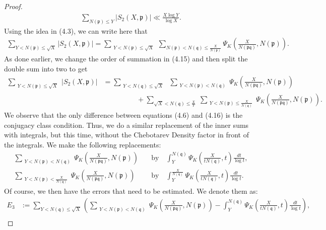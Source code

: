 \documentclass[12pt]{article}
\numberwithin{equation}{section}
\numberwithin{equation}{section}
\begin{document}
\begin{proof}
\begin{align}
    \sum_{N(\mathfrak{p})\leq Y} |S_2(X,\mathfrak{p})| \ll\frac{X\log Y}{\log X}.
\end{align}
Using the idea in (4.3), we can write here that
\begin{align}
    \sum_{Y<N(\mathfrak{p}) \leq \sqrt{X}} |S_2(X,\mathfrak{p})| = \sum_{\substack{Y<N(\mathfrak{p}) \leq \sqrt{X} }} \sum_{N(\mathfrak{p})<N(\mathfrak{q})\leq \frac{X}{N(\mathfrak{p})}} \Psi_K\left(\frac{X}{N(\mathfrak{p}\mathfrak{q})},N(\mathfrak{p})\right) .
\end{align}
As done earlier, we change the order of summation in (4.15) and then split the double sum into two to get
\begin{align}
    \sum_{\substack{Y<N(\mathfrak{p}) \leq \sqrt{X} }} |S_2(X,\mathfrak{p})| &= \sum_{\substack{Y <N(\mathfrak{q}) \leq \sqrt{X}}} \;  \sum_{\substack{Y<N(\mathfrak{p})<N(\mathfrak{q}) }} \Psi_K\left(\frac{X}{N(\mathfrak{p}\mathfrak{q})},N(\mathfrak{p})\right) \nonumber \\ &\hspace{2cm}+ \sum_{\sqrt{X} < N(\mathfrak{q}) \leq \frac{X}{Y}} \;\sum_{\substack{Y<N(\mathfrak{p})\leq \frac{X}{N(\mathfrak{q})}} } \Psi_K\left(\frac{X}{N(\mathfrak{p}\mathfrak{q})},N(\mathfrak{p})\right) .
\end{align}
We observe that the only difference between equations (4.6) and (4.16) is the conjugacy class condition. Thus, we do a similar replacement of the inner sums with integrals, but this time, without the Chebotarev Density factor in front of the integrals. We make the following replacements:
\begin{align}
    \sum_{\substack{Y<N(\mathfrak{p})<N(\mathfrak{q}) }} \Psi_K\left(\frac{X}{N(\mathfrak{p}\mathfrak{q})},N(\mathfrak{p})\right) \quad &\text{by} \quad \int_Y^{N(\mathfrak{q})} \Psi_K\left(\frac{X}{tN(\mathfrak{q})},t\right)\frac{dt}{\log t}, \nonumber \\
     \sum_{\substack{Y<N(\mathfrak{p})<\frac{X}{N(\mathfrak{q})} }} \Psi_K\left(\frac{X}{N(\mathfrak{p}\mathfrak{q})},N(\mathfrak{p})\right) \quad &\text{by} \quad \int_Y^{\frac{X}{N(\mathfrak{q})}} \Psi_K\left(\frac{X}{tN(\mathfrak{q})},t\right)\frac{dt}{\log t}. \nonumber
\end{align}
Of course, we then have the errors that need to be estimated. We denote them as:
\begin{align}
    E_3&:=\sum_{Y<N(\mathfrak{q})\leq \sqrt{X}}\left(\sum_{\substack{Y<N(\mathfrak{p})<N(\mathfrak{q}) }} \Psi_K\left(\frac{X}{N(\mathfrak{p}\mathfrak{q})},N(\mathfrak{p})\right) - \int_Y^{N(\mathfrak{q})} \Psi_K\left(\frac{X}{tN(\mathfrak{q})},t\right)\frac{dt}{\log t}\right), \nonumber \\

\end{align}
\end{proof}
\end{document}
